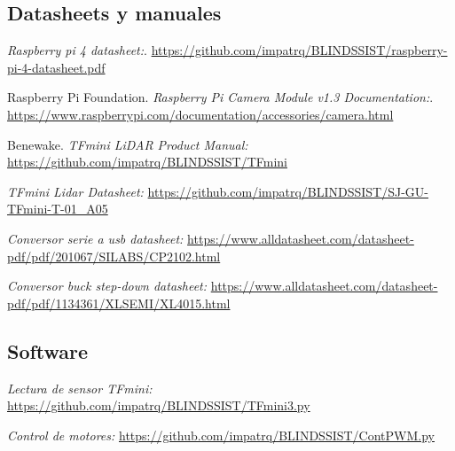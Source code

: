 \documentclass[12pt,a4paper]{article}
\begin{document}
\begin{thebibliography}{9}

\subsection{Datasheets y manuales}

\emph{Raspberry pi 4 datasheet:}. \href{https://github.com/impatrq/BLINDSSIST/blob/main/Hardware/raspberry-pi-4-datasheet.pdf}{https://github.com/impatrq/BLINDSSIST/raspberry-pi-4-datasheet.pdf}

Raspberry Pi Foundation. 
\emph{Raspberry Pi Camera Module v1.3 Documentation:}. \href{https://www.raspberrypi.com/documentation/accessories/camera.html}{https://www.raspberrypi.com/documentation/accessories/camera.html}

Benewake. 
\emph{TFmini LiDAR Product Manual:} \href{https://github.com/impatrq/BLINDSSIST/blob/main/Hardware/TFmini/SJ-PM-TFmini-T-01_A06%20Product%20Manual_EN.pdf}{https://github.com/impatrq/BLINDSSIST/TFmini}

\emph{TFmini Lidar Datasheet:}
\href{https://github.com/impatrq/BLINDSSIST/blob/main/Hardware/TFmini/SJ-GU-TFmini-T-01_A05%20Datasheet.pdf}{https://github.com/impatrq/BLINDSSIST/SJ-GU-TFmini-T-01_A05}

\emph{Conversor serie a usb datasheet:}
\href{https://www.alldatasheet.com/datasheet-pdf/pdf/201067/SILABS/CP2102.html}{https://www.alldatasheet.com/datasheet-pdf/pdf/201067/SILABS/CP2102.html}

\emph{Conversor buck step-down datasheet:}
\href{https://www.alldatasheet.com/datasheet-pdf/pdf/1134361/XLSEMI/XL4015.html}{https://www.alldatasheet.com/datasheet-pdf/pdf/1134361/XLSEMI/XL4015.html}

\subsection{Software}

\emph{Lectura de sensor TFmini:}
\href{https://github.com/impatrq/BLINDSSIST/blob/main/firmware/TFmini3.py}{https://github.com/impatrq/BLINDSSIST/TFmini3.py}

\emph{Control de motores:}
\href{https://github.com/impatrq/BLINDSSIST/blob/main/firmware/TFmini/ContPWM.py}{https://github.com/impatrq/BLINDSSIST/ContPWM.py}


\end{thebibliography}
\end{document}
